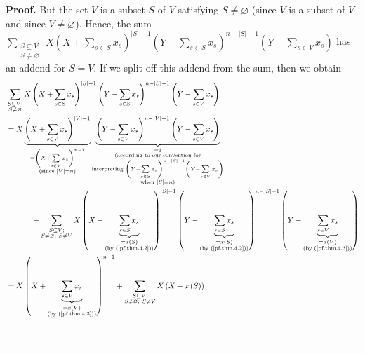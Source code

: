\documentclass[numbers=enddot,12pt,final,onecolumn,notitlepage]{scrartcl}%
\theoremstyle{definition}
\newenvironment{proof}[1][Proof]{\noindent\textbf{#1.} }{\ \rule{0.5em}{0.5em}}
\let\sumnonlimits\sum
\renewcommand{\sum}{\sumnonlimits\limits}
\newenvironment{verlong}{}{}
\begin{document}
\begin{verlong}
\begin{proof}
But the set $V$ is a subset $S$ of $V$ satisfying $S\neq\varnothing$ (since
$V$ is a subset of $V$ and since $V\neq\varnothing$). Hence, the sum
$\sum_{\substack{S\subseteq V;\\S\neq\varnothing}}X\left(  X+\sum_{s\in
S}x_{s}\right)  ^{\left\vert S\right\vert -1}\left(  Y-\sum_{s\in S}%
x_{s}\right)  ^{n-\left\vert S\right\vert -1}\left(  Y-\sum_{s\in V}%
x_{s}\right)  $ has an addend for $S=V$. If we split off this addend from the
sum, then we obtain%
\begin{align}
&  \sum_{\substack{S\subseteq V;\\S\neq\varnothing}}X\left(  X+\sum_{s\in
S}x_{s}\right)  ^{\left\vert S\right\vert -1}\left(  Y-\sum_{s\in S}%
x_{s}\right)  ^{n-\left\vert S\right\vert -1}\left(  Y-\sum_{s\in V}%
x_{s}\right) \nonumber\\
&  =X\underbrace{\left(  X+\sum_{s\in V}x_{s}\right)  ^{\left\vert
V\right\vert -1}}_{\substack{=\left(  X+\sum_{s\in V}x_{s}\right)
^{n-1}\\\text{(since }\left\vert V\right\vert =n\text{)}}}\underbrace{\left(
Y-\sum_{s\in V}x_{s}\right)  ^{n-\left\vert V\right\vert -1}\left(
Y-\sum_{s\in V}x_{s}\right)  }_{\substack{=1\\\text{(according to our
convention for}\\\text{interpreting }\left(  Y-\sum_{s\in S}x_{s}\right)
^{n-\left\vert S\right\vert -1}\left(  Y-\sum_{s\in V}x_{s}\right)
\\\text{when }\left\vert S\right\vert =n\text{)}}}\nonumber\\
&  \ \ \ \ \ \ \ \ \ \ +\sum_{\substack{S\subseteq V;\\S\neq\varnothing
;\ S\neq V}}X\left(  X+\underbrace{\sum_{s\in S}x_{s}}_{\substack{=x\left(
S\right)  \\\text{(by (\ref{pf.thm.4.2}))}}}\right)  ^{\left\vert S\right\vert
-1}\left(  Y-\underbrace{\sum_{s\in S}x_{s}}_{\substack{=x\left(  S\right)
\\\text{(by (\ref{pf.thm.4.2}))}}}\right)  ^{n-\left\vert S\right\vert
-1}\left(  Y-\underbrace{\sum_{s\in V}x_{s}}_{\substack{=x\left(  V\right)
\\\text{(by (\ref{pf.thm.4.3}))}}}\right) \nonumber\\
&  =X\left(  X+\underbrace{\sum_{s\in V}x_{s}}_{\substack{=x\left(  V\right)
\\\text{(by (\ref{pf.thm.4.3}))}}}\right)  ^{n-1}+\sum_{\substack{S\subseteq
V;\\S\neq\varnothing;\ S\neq V}}X\left(  X+x\left(  S\right)  \right)

\end{align}
\end{proof}
\end{verlong}
\end{document}
